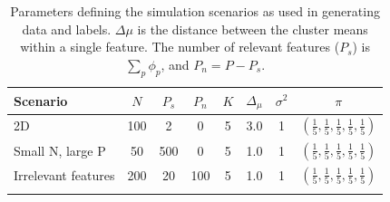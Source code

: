 \documentclass{bioinfo}
\begin{document}
\begin{table}[ht]
	\centering
	\caption{Parameters defining the simulation scenarios as used in generating data and labels. $\Delta \mu$ is the distance between the cluster means within a single feature.
	The number of relevant features (\(P_s\)) is $\sum_p \phi_p$, and $P_n = P - P_s$.}
	\begin{tabular}{l|ccccccc}
		\toprule
		\textbf{Scenario} & $N$ & $P_s$ & $P_n$ & $K$ & $\Delta_{\mu}$ & $\sigma^2$ & $\pi$\\
		\midrule
		2D & 100 & 2 & 0 & 5 & 3.0 & 1 &  $(\frac{1}{5} , \frac{1}{5}, \frac{1}{5}, \frac{1}{5}, \frac{1}{5})$ \\
		Small N, large P & 50 & 500 & 0 & 5 & 1.0 & 1 &  $(\frac{1}{5} , \frac{1}{5}, \frac{1}{5}, \frac{1}{5}, \frac{1}{5})$\\
		Irrelevant features & 200 & 20 & 100 & 5 & 1.0 & 1 &  $(\frac{1}{5} , \frac{1}{5}, \frac{1}{5}, \frac{1}{5}, \frac{1}{5})$\\
		\botrule
	\end{tabular}
	\label{table:scenarioTable}
\end{table}%
\end{document}
